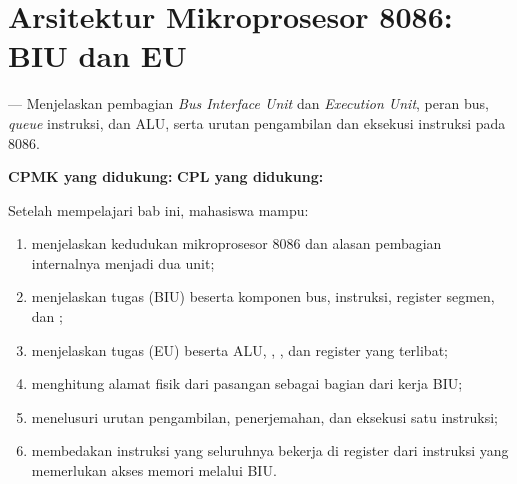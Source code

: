 \documentclass[../../main.tex]{subfiles}
\begin{document}
\chapter{Arsitektur Mikroprosesor 8086: BIU dan EU}
\label{chap:arsitektur-8086}


\begin{subcpmkbox}
\vspace{1.1em}
 --- Menjelaskan pembagian \textit{Bus Interface Unit}
dan \textit{Execution Unit}, peran bus, \textit{queue} instruksi, dan
ALU, serta urutan pengambilan dan eksekusi instruksi pada 8086.

\vspace{0.4em}
\textbf{CPMK yang didukung:}  \quad\textbullet\quad
\textbf{CPL yang didukung:} 
\end{subcpmkbox}

\begin{tujuanbox}
\vspace{1.1em}
Setelah mempelajari bab ini, mahasiswa mampu:
\begin{enumerate}
    \item menjelaskan kedudukan mikroprosesor 8086 dan alasan
          pembagian internalnya menjadi dua unit;
    \item menjelaskan tugas  (BIU) beserta
          komponen bus,  instruksi, register segmen, dan
          ;
    \item menjelaskan tugas  (EU) beserta ALU,
          , , dan
          register yang terlibat;
    \item menghitung alamat fisik dari pasangan 
          sebagai bagian dari kerja BIU;
    \item menelusuri urutan pengambilan, penerjemahan, dan eksekusi
          satu instruksi;
    \item membedakan instruksi yang seluruhnya bekerja di register
          dari instruksi yang memerlukan akses memori melalui BIU.
\end{enumerate}
\end{tujuanbox}
\end{document}
